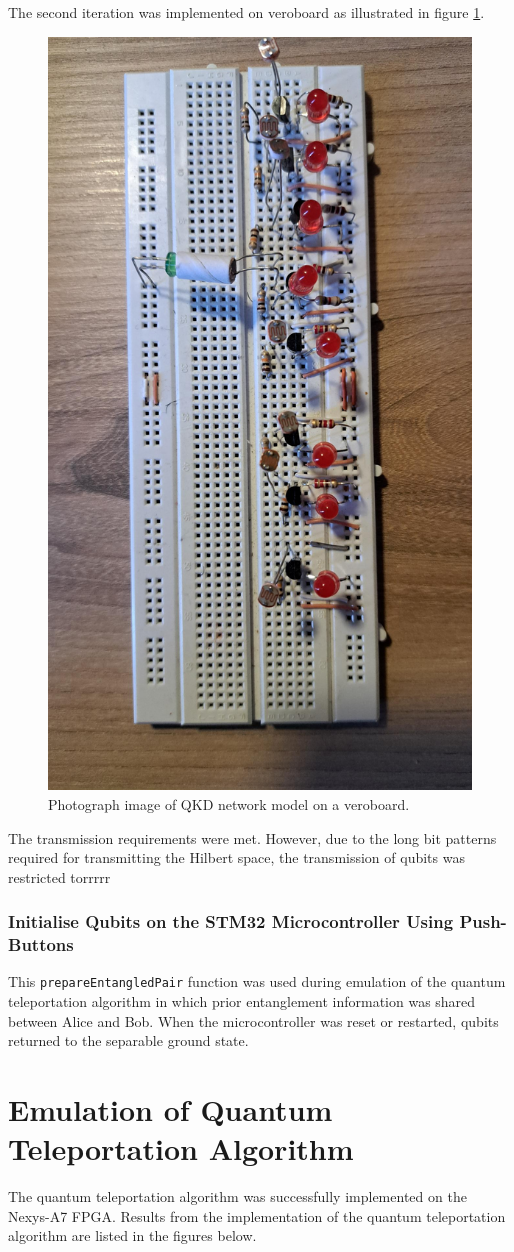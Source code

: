 The second iteration was implemented on veroboard as illustrated in figure \ref{fig:veroboard}.
\begin{figure}[!ht]
	\centering
	\includegraphics[width=0.45\linewidth]{body/ch6/figs/bread}
	\caption[Diagram of Second Iteration of the Quantum Channel On a Veroboard.]{Photograph image of QKD network model on a veroboard.}
	\label{fig:veroboard}
\end{figure}
The transmission requirements were met. However, due to the long bit patterns required for transmitting the Hilbert space, the transmission of qubits was restricted torrrrr


\subsubsection{Initialise Qubits on the STM32 Microcontroller Using Push-Buttons}

This \texttt{prepareEntangledPair} function was used during emulation of the quantum teleportation algorithm in which prior entanglement information was shared between Alice and Bob. When the microcontroller was reset or restarted, qubits returned to the separable ground state. 

\section{\label{sec:ch5_subsec1}Emulation of Quantum Teleportation Algorithm}

The quantum teleportation algorithm was successfully implemented on the Nexys-A7 FPGA. Results from the implementation of the quantum teleportation algorithm are listed in the figures below.

